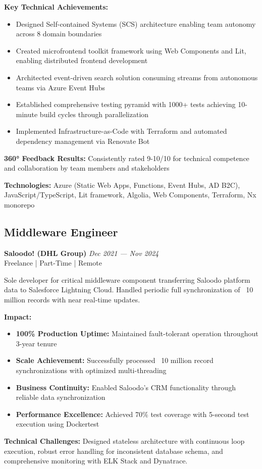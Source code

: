 \documentclass[10pt,a4paper]{article}
\newcommand{\role}[4]{\subsection{#1}\textbf{#2} \hfill \textit{#3}\\#4\vspace{2mm}}
\newcommand{\achievement}[1]{\item \textbf{#1}}
\begin{document}
\textbf{Key Technical Achievements:}
\begin{itemize}
\item Designed Self-contained Systems (SCS) architecture enabling team autonomy across 8 domain boundaries
\item Created microfrontend toolkit framework using Web Components and Lit, enabling distributed frontend development
\item Architected event-driven search solution consuming streams from autonomous teams via Azure Event Hubs
\item Established comprehensive testing pyramid with 1000+ tests achieving 10-minute build cycles through parallelization
\item Implemented Infrastructure-as-Code with Terraform and automated dependency management via Renovate Bot
\end{itemize}

\textbf{360° Feedback Results:} Consistently rated 9-10/10 for technical competence and collaboration by team members and stakeholders

\textbf{Technologies:} Azure (Static Web Apps, Functions, Event Hubs, AD B2C), JavaScript/TypeScript, Lit framework, Algolia, Web Components, Terraform, Nx monorepo

\newpage

\role{Middleware Engineer}{Saloodo! (DHL Group)}{Dec 2021 — Nov 2024}{Freelance | Part-Time | Remote}

Sole developer for critical middleware component transferring Saloodo platform data to Salesforce Lightning Cloud. Handled periodic full synchronization of ~10 million records with near real-time updates.

\textbf{Impact:}
\begin{itemize}
\achievement{100\% Production Uptime:} Maintained fault-tolerant operation throughout 3-year tenure
\achievement{Scale Achievement:} Successfully processed ~10 million record synchronizations with optimized multi-threading
\achievement{Business Continuity:} Enabled Saloodo's CRM functionality through reliable data synchronization
\achievement{Performance Excellence:} Achieved 70\% test coverage with 5-second test execution using Dockertest
\end{itemize}

\textbf{Technical Challenges:} Designed stateless architecture with continuous loop execution, robust error handling for inconsistent database schema, and comprehensive monitoring with ELK Stack and Dynatrace.
\end{document}
